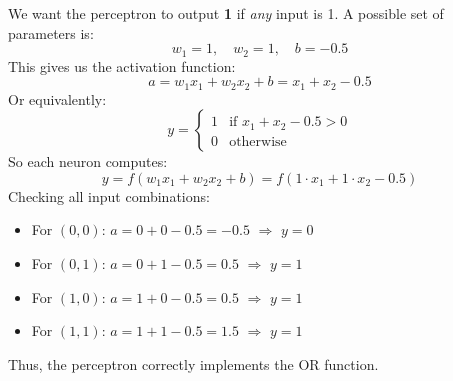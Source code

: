\begin{examplebox}
    We want the perceptron to output \textbf{1} if \emph{any} input is 1. A possible set of parameters is:
    \begin{equation*}
        w_{1} = 1, \quad w_{2} = 1, \quad b = -0.5
    \end{equation*}
    This gives us the activation function:
    \begin{equation*}
        a = w_{1} x_{1} + w_{2} x_{2} + b = x_{1} + x_{2} - 0.5
    \end{equation*}
    Or equivalently:
    \begin{equation*}
        y =
        \begin{cases}
            1 & \text{if } x_{1} + x_{2} - 0.5 > 0 \\
            0 & \text{otherwise}
        \end{cases}
    \end{equation*}
    So each neuron computes:
    \begin{equation*}
        y = f\left(
            w_{1} x_{1} + w_{2} x_{2} + b
        \right) = f\left(
            1 \cdot x_{1} + 1 \cdot x_{2} - 0.5
        \right)
    \end{equation*}
    Checking all input combinations:
    \begin{itemize}
        \item For $(0, 0)$: $a = 0 + 0 - 0.5 = -0.5$ $\Rightarrow$ $y = 0$
        \item For $(0, 1)$: $a = 0 + 1 - 0.5 = 0.5$ $\Rightarrow$ $y = 1$
        \item For $(1, 0)$: $a = 1 + 0 - 0.5 = 0.5$ $\Rightarrow$ $y = 1$
        \item For $(1, 1)$: $a = 1 + 1 - 0.5 = 1.5$ $\Rightarrow$ $y = 1$
    \end{itemize}
    Thus, the perceptron correctly implements the OR function.
\end{examplebox}

